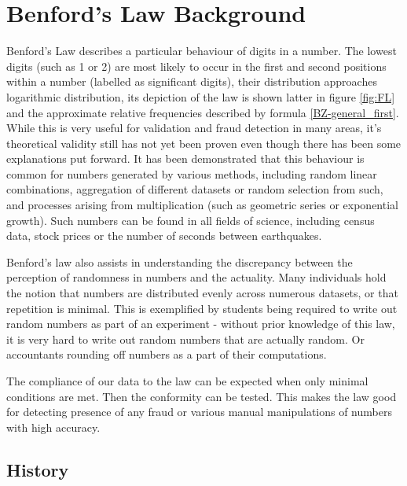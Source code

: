 \chapter{Benford's Law Background} %

Benford's Law describes a particular behaviour of digits in a number. The lowest digits (such as 1 or 2) are most likely to occur in the first and second positions within a number (labelled as significant digits), their distribution approaches logarithmic distribution, its depiction of the law is shown latter in figure \ref{fig:FL} and the approximate relative frequencies described by formula \ref{BZ-general_first}. While this is very useful for validation and fraud detection in many areas, it's theoretical validity still has not yet been proven even though there has been some explanations put forward. %
It has been demonstrated that this behaviour is common for numbers generated by various methods, including random linear combinations, aggregation of different datasets or random selection from such, and processes arising from multiplication (such as geometric series or exponential growth). Such numbers can be found in all fields of science, including census data, stock prices or the number of seconds between earthquakes. \cite{Hronova2023,kossovsky2014benford, Cerqueti2202} %

Benford's law also assists in understanding the discrepancy between the perception of randomness in numbers and the actuality. Many individuals hold the notion that numbers are distributed evenly across numerous datasets, or that repetition is minimal. This is exemplified by students being required to write out random numbers as part of an experiment - without prior knowledge of this law, it is very hard to write out random numbers that are actually random. Or accountants rounding off numbers as a part of their computations. \cite{kossovsky2014benford} %

The compliance of our data to the law can be expected when only minimal conditions are met. Then the conformity can be tested. This makes the law good for detecting presence of any fraud or various manual manipulations of numbers with high accuracy. \cite{kossovsky2014benford, Cerqueti2202,kossovsky2014benford} 

\section{History}

